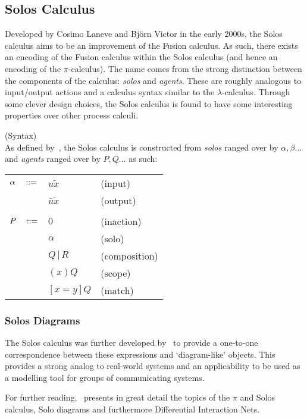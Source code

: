\subsection{Solos Calculus}
    
    Developed by Cosimo Laneve and Bj{\"o}rn Victor in the early 2000s, the Solos calculus aims to be an improvement of the Fusion calculus.
    As such, there exists an encoding of the Fusion calculus within the Solos calculus (and hence an encoding of the $\pi$-calculus).
    The name comes from the strong distinction between the components of the calculus: \textit{solos} and \textit{agents}.
    These are roughly analogous to input/output actions and a calculus syntax similar to the $\lambda$-calculus.
    Through some clever design choices, the Solos calculus is found to have some interesting properties over other process calculi.

    \begin{definition}{(Syntax)\\}
        As defined by~\cite{solo-calculus}, the Solos calculus is constructed from \textit{solos} ranged over by $\alpha, \beta \ldots$ and \textit{agents} ranged over by $P, Q \ldots$ as such:
        \begin{center}
            \begin{tabular}{ l l l }
                $\alpha \quad ::=$   & $u\tilde{x}$          & (input) \\
                                        & $\bar{u}\tilde{x}$    & (output) \\ \\
                $P \quad ::=$        & $0$                   & (inaction) \\
                                        & $\alpha$              & (solo) \\
                                        & $Q \, | \, R$         & (composition) \\
                                        & $(x)Q$                & (scope) \\
                                        & $[x=y]Q$              & (match) \\
            \end{tabular}
        \end{center}
    \end{definition}


 
    \subsubsection{Solos Diagrams}
        The Solos calculus was further developed by~\cite{solo-diagrams} to provide a one-to-one correspondence between these  expressions and `diagram-like' objects.
        This provides a strong analog to real-world systems and an applicability to be used as a modelling tool for groups of communicating systems.

    \begin{remarks} 
        For further reading,~\cite{acyclic-solos} presents in great detail the topics of the $\pi$ and Solos calculus, Solo diagrams and furthermore Differential Interaction Nets.
    \end{remarks}


